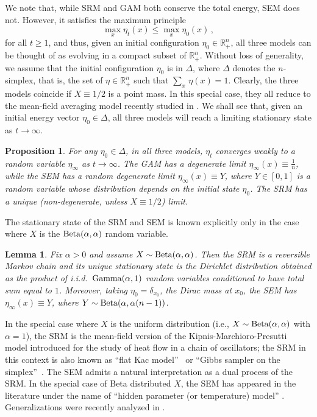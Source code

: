\documentclass[11pt,reqno]{amsart}
\newtheorem{proposition}[theorem]{Proposition}
\newtheorem{lemma}[theorem]{Lemma}
\theoremstyle{remark}
\theoremstyle{definition}
\numberwithin{equation}{section}
\numberwithin{figure}{section}
\newcommand{\R}{\mathbb{R}}
\let\a=\alpha \let\b=\beta  \let\c=\chi \let\d=\delta  \let\e=\varepsilon
\let\D=\Delta \let\F=\Phi  \let\G=\Gamma  \let\L=\Lambda \let\The=\Theta
\begin{document}
We note that, while SRM and GAM both conserve the total energy, SEM does not. However, it satisfies the maximum principle 
\begin{equation}\label{eq:max}
\max_{x}\eta_t(x)\le \max_{x}\eta_{0}(x)\,,
\end{equation} for all $t\ge 1$, and thus, given an initial configuration $\eta_0\in \R_+^n$, all three models can be thought of as evolving in a compact subset of $\R_+^n$. Without loss of generality, we assume that the initial configuration $\eta_0$ is in $\D$, where $\D$ denotes the $n$-simplex, that is, the set of $\eta\in\R_+^n$ such that $\textstyle{\sum_{x}}\,\eta(x)=1$.
Clearly, the three models coincide if $X\equiv 1/2$ is a point mass. In this special case, they all reduce to the mean-field averaging model recently studied in \cite{chatterjee2020phase}. We shall see that, given an initial energy vector $\eta_0\in \D$,   all three models will reach a limiting stationary state as $t\to\infty$. 
\begin{proposition}\label{prop:uniqueness}
For  any $\eta_0\in \D$, in all three models,  $\eta_t$ converges weakly to a random variable $\eta_\infty$ as $t\to\infty$. The GAM has a degenerate limit $\eta_\infty(x)\equiv\frac1n$, while the SEM has a random degenerate limit $\eta_\infty(x)\equiv Y$, where $Y\in[0,1]$ is a random variable whose distribution depends on the initial state $\eta_0$.  The SRM has a unique (non-degenerate, unless $X\equiv 1/2$) limit.
\end{proposition}
The stationary state of the SRM and SEM is known explicitly only in the case where $X$ is the ${\rm Beta}(\alpha,\alpha)$ random variable. 

\begin{lemma}\label{lem:gamma}
Fix $\a>0$ and assume $X\sim{\rm Beta}(\alpha,\alpha)$. Then the SRM is a reversible Markov chain and its unique stationary state is the Dirichlet distribution obtained as the product of i.i.d.\  ${\rm Gamma}(\alpha,1)$ random variables conditioned to have total sum equal to $1$. Moreover, taking $\eta_0=\d_{x_0}$, the Dirac mass at  $x_0$, the SEM has $\eta_\infty(x)\equiv Y$, where $Y\sim {\rm Beta}(\alpha,\alpha(n-1))$.	
\end{lemma}
 In the special case where $X$ is the uniform distribution (i.e., $X\sim {\rm Beta}(\alpha,\alpha)$ with $\alpha=1$), the SRM is the mean-field version of the Kipnis-Marchioro-Presutti model \cite{kipnis_heat_1982} introduced for the study of heat flow in a chain of oscillators; the SRM in this context is also known as \textquotedblleft flat Kac model\textquotedblright\ \cite{caputo_kac2008} or \textquotedblleft Gibbs sampler on the simplex\textquotedblright\ \cite{smith_gibbs_2014}. The SEM admits a natural interpretation as a dual process of the SRM. In the special case of Beta distributed $X$, the SEM has appeared in the literature under the name of ``hidden parameter (or temperature) model'' \cite{de_masi_ferrari_gabrielli_hidden_2023,giardina_redig_tol_intertwining_2024}. Generalizations were recently analyzed in \cite{kim2025spectral}.
\end{document}
